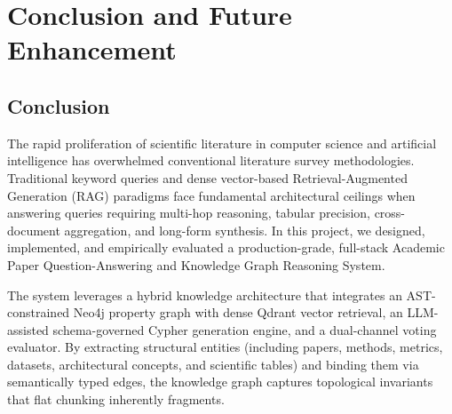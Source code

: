 \chapter{Conclusion and Future Enhancement}
\label{chap:conclusion}

\section{Conclusion}
\label{sec:conclusion_summary}
The rapid proliferation of scientific literature in computer science and artificial intelligence has overwhelmed conventional literature survey methodologies. Traditional keyword queries and dense vector-based Retrieval-Augmented Generation (RAG) paradigms face fundamental architectural ceilings when answering queries requiring multi-hop reasoning, tabular precision, cross-document aggregation, and long-form synthesis. In this project, we designed, implemented, and empirically evaluated a production-grade, full-stack Academic Paper Question-Answering and Knowledge Graph Reasoning System. 

The system leverages a hybrid knowledge architecture that integrates an AST-constrained Neo4j property graph with dense Qdrant vector retrieval, an LLM-assisted schema-governed Cypher generation engine, and a dual-channel voting evaluator. By extracting structural entities (including papers, methods, metrics, datasets, architectural concepts, and scientific tables) and binding them via semantically typed edges, the knowledge graph captures topological invariants that flat chunking inherently fragments. 

